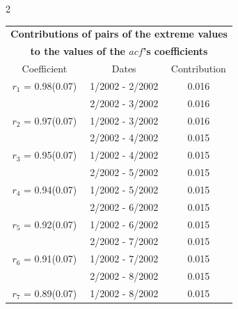 
\thispagestyle{empty}
\begin{multicols}{2}{ 
\begin{tabular}{ccc}
\multicolumn{3}{c}{\textbf{Contributions of pairs of the extreme values} }  \vspace{-.10in}  \\ 
\multicolumn{3}{c}{ \textbf{to the values of the $acf$'s coefficients}} \\ 
\hline 
\hline                  Coefficient  &  Dates &  Contribution \\ 
\hline 
  $r_{ 1}$ = 0.98(0.07) &       1/2002 -  2/2002 &        0.016   \vspace{-.10in} \\  
&        2/2002 -  3/2002 &        0.016  \vspace{-.02in} \\ \hline 
  $r_{ 2}$ = 0.97(0.07) &       1/2002 -  3/2002 &        0.016   \vspace{-.10in} \\  
&        2/2002 -  4/2002 &        0.015  \vspace{-.02in} \\ \hline 
  $r_{ 3}$ = 0.95(0.07) &       1/2002 -  4/2002 &        0.015   \vspace{-.10in} \\  
&        2/2002 -  5/2002 &        0.015  \vspace{-.02in} \\ \hline 
  $r_{ 4}$ = 0.94(0.07) &       1/2002 -  5/2002 &        0.015   \vspace{-.10in} \\  
&        2/2002 -  6/2002 &        0.015  \vspace{-.02in} \\ \hline 
  $r_{ 5}$ = 0.92(0.07) &       1/2002 -  6/2002 &        0.015   \vspace{-.10in} \\  
&        2/2002 -  7/2002 &        0.015  \vspace{-.02in} \\ \hline 
  $r_{ 6}$ = 0.91(0.07) &       1/2002 -  7/2002 &        0.015   \vspace{-.10in} \\  
&        2/2002 -  8/2002 &        0.015  \vspace{-.02in} \\ \hline 
  $r_{ 7}$ = 0.89(0.07) &       1/2002 -  8/2002 &        0.015   \vspace{-.10in} \\  

\end{tabular}}
\end{multicols}
